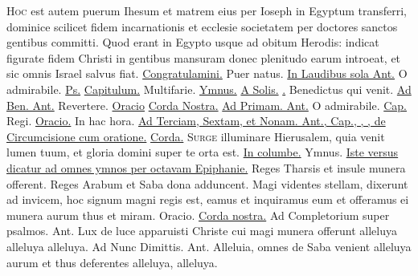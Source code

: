 \begin{multicols*}{2}
\lettrine[lines=2]{\zallmancaps \color{Blue} H}{oc} est autem puerum Ihesum et matrem eius per Ioseph in Egyptum transferri, dominice scilicet fidem incarnationis et ecclesie societatem per doctores sanctos gentibus committi. Quod erant in Egypto usque ad obitum Herodis: indicat figurate fidem Christi in gentibus mansuram donec plenitudo earum introeat, et sic omnis Israel salvus fiat. \R \hyperlink{congratulamini-michi}{Congratulamini.}  \V Puer natus.
\newline \ul{In Laudibus sola Ant.} O admirabile. \ul{Ps.}  \ul{Capitulum.} Multifarie. \ul{Ymnus.} \hyperlink{a-solis-ortus}{A Solis.} \ul{\Vbar .} Benedictus qui venit. \ul{Ad Ben. Ant.} Revertere. \ul{Oracio} \hyperlink{corda-nostra-vigilia-epiphanie}{Corda Nostra.} \ul{Ad Primam. Ant.} O admirabile. \ul{Cap.} Regi. \ul{Oracio.} In hac hora. \ul{Ad Terciam, Sextam, et Nonam. Ant., Cap., \Rbar , \Vbar , de Circumcisione cum oratione.} \hyperlink{corda-nostra-vigilia-epiphanie}{Corda.}
\lettrine[lines=2]{\zallmancaps \color{Red} S}{urge} \hypertarget{surge-capitulum}{illuminare} Hierusalem, quia venit lumen tuum, et gloria domini super te orta est. \R \hyperlink{in-columbe}{In columbe.} {\color{Red} Ymnus.}
\newline \ul{Iste versus dicatur ad omnes ymnos per octavam Epiphanie.}
\newline \V Reges Tharsis et insule munera offerent.
\newline \R Reges Arabum et Saba dona adduncent.
 Magi videntes stellam, dixerunt ad invicem, hoc signum magni regis est, eamus et inquiramus eum et offeramus ei munera aurum thus et miram. {\color{Red} Oracio.} \hyperlink{corda-nostra-vigilia-epiphanie}{Corda nostra.} {\color{Red} Ad Completorium super psalmos. Ant.} Lux de luce apparuisti Christe cui magi munera offerunt alleluya alleluya alleluya. {\color{Red} Ad Nunc Dimittis. Ant.} Alleluia, omnes de Saba venient alleluya aurum et thus deferentes alleluya, alleluya.

\end{multicols*}
